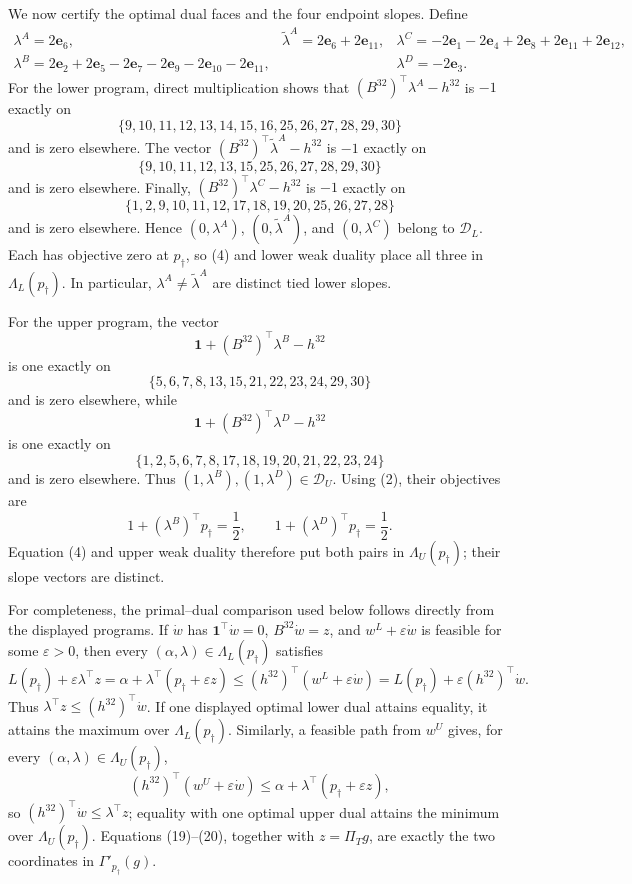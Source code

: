 We now certify the optimal dual faces and the four endpoint slopes.  Define
\[
\begin{array}{lll}
\lambda^A=2\mathbf e_6,
&\widetilde\lambda^A=2\mathbf e_6+2\mathbf e_{11},
&\lambda^C=-2\mathbf e_1-2\mathbf e_4+2\mathbf e_8+2\mathbf e_{11}+2\mathbf e_{12},\\
\lambda^B=2\mathbf e_2+2\mathbf e_5-2\mathbf e_7-2\mathbf e_9-2\mathbf e_{10}-2\mathbf e_{11},
&&\lambda^D=-2\mathbf e_3.
\end{array}
\tag{12}
\]
For the lower program, direct multiplication shows that \((B^{32})^\top\lambda^A-h^{32}\) is \(-1\) exactly on
\[
\{9,10,11,12,13,14,15,16,25,26,27,28,29,30\}
\tag{13}
\]
and is zero elsewhere.  The vector \((B^{32})^\top\widetilde\lambda^A-h^{32}\) is \(-1\) exactly on
\[
\{9,10,11,12,13,15,25,26,27,28,29,30\}
\tag{14}
\]
and is zero elsewhere.  Finally, \((B^{32})^\top\lambda^C-h^{32}\) is \(-1\) exactly on
\[
\{1,2,9,10,11,12,17,18,19,20,25,26,27,28\}
\tag{15}
\]
and is zero elsewhere.  Hence \((0,\lambda^A)\), \((0,\widetilde\lambda^A)\), and \((0,\lambda^C)\) belong to \(\mathcal D_L\).  Each has objective zero at \(p_\dagger\), so (4) and lower weak duality place all three in \(\Lambda_L(p_\dagger)\).  In particular, \(\lambda^A\neq\widetilde\lambda^A\) are distinct tied lower slopes.

For the upper program, the vector
\[
\mathbf 1+(B^{32})^\top\lambda^B-h^{32}
\]
is one exactly on
\[
\{5,6,7,8,13,15,21,22,23,24,29,30\}
\tag{16}
\]
and is zero elsewhere, while
\[
\mathbf 1+(B^{32})^\top\lambda^D-h^{32}
\]
is one exactly on
\[
\{1,2,5,6,7,8,17,18,19,20,21,22,23,24\}
\tag{17}
\]
and is zero elsewhere.  Thus \((1,\lambda^B),(1,\lambda^D)\in\mathcal D_U\).  Using (2), their objectives are
\[
1+(\lambda^B)^\top p_\dagger=\frac12,
\qquad
1+(\lambda^D)^\top p_\dagger=\frac12.
\tag{18}
\]
Equation (4) and upper weak duality therefore put both pairs in \(\Lambda_U(p_\dagger)\); their slope vectors are distinct.

For completeness, the primal--dual comparison used below follows directly from the displayed programs.  If \(\dot w\) has \(\mathbf 1^\top\dot w=0\), \(B^{32}\dot w=z\), and \(w^L+\varepsilon\dot w\) is feasible for some \(\varepsilon>0\), then every \((\alpha,\lambda)\in\Lambda_L(p_\dagger)\) satisfies
\[
L(p_\dagger)+\varepsilon\lambda^\top z
=\alpha+\lambda^\top(p_\dagger+\varepsilon z)
\leq (h^{32})^\top(w^L+\varepsilon\dot w)
=L(p_\dagger)+\varepsilon(h^{32})^\top\dot w.
\tag{19}
\]
Thus \(\lambda^\top z\leq(h^{32})^\top\dot w\).  If one displayed optimal lower dual attains equality, it attains the maximum over \(\Lambda_L(p_\dagger)\).  Similarly, a feasible path from \(w^U\) gives, for every \((\alpha,\lambda)\in\Lambda_U(p_\dagger)\),
\[
(h^{32})^\top(w^U+\varepsilon\dot w)
\leq \alpha+\lambda^\top(p_\dagger+\varepsilon z),
\tag{20}
\]
so \((h^{32})^\top\dot w\leq\lambda^\top z\); equality with one optimal upper dual attains the minimum over \(\Lambda_U(p_\dagger)\).  Equations (19)--(20), together with \(z=\Pi_Tg\), are exactly the two coordinates in \(\Gamma'_{p_\dagger}(g)\).

